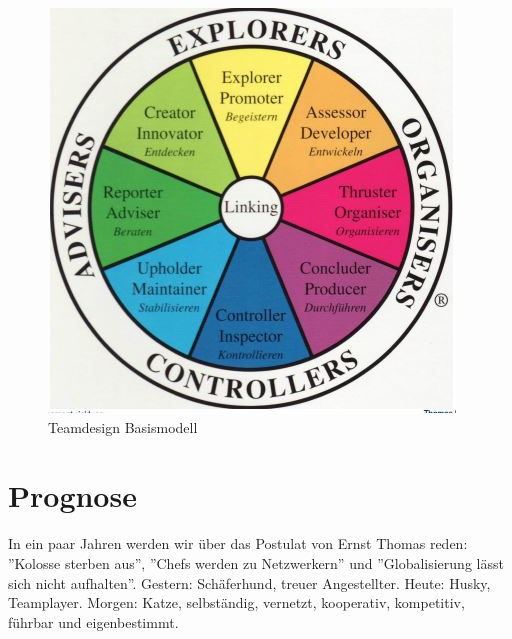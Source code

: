 \begin{figure}[h!]
\centering
\includegraphics[width=0.5\linewidth]{fig/teamentwicklung-teamdesign-basismodell}
\caption{Teamdesign Basismodell}
\label{fig:teamentwicklung-teamdesign-basismodell}
\end{figure}

\section{Prognose}
In ein paar Jahren werden wir über das Postulat von Ernst Thomas reden: ''Kolosse sterben aus'', ''Chefs werden zu Netzwerkern'' und ''Globalisierung lässt sich nicht aufhalten''. Gestern: Schäferhund, treuer Angestellter. Heute: Husky, Teamplayer. Morgen: Katze, selbständig, vernetzt, kooperativ, kompetitiv, führbar und eigenbestimmt.
